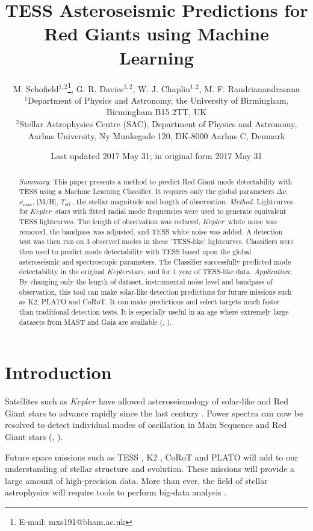 \documentclass[a4paper,fleqn,usenatbib,useAMS]{mnras}
\title[TRG]{TESS Asteroseismic Predictions for Red Giants using Machine Learning}
\author[M. Schofield et al.]{M. Schofield$^{1, 2}$\thanks{E-mail: mxs191@bham.ac.uk}, G. R. Davies$^{1, 2}$, W. J. Chaplin$^{1, 2}$, M. F. Randrianandrasana
\\
$^{1}$Department of Physics and Astronomy, the University of Birmingham, Birmingham B15 2TT, UK \\
$^{2}$Stellar Astrophysics Centre (SAC), Department of Physics and Astronomy, Aarhus University, Ny Munkegade 120, DK-8000 Aarhus C, Denmark}
\date{Last updated 2017 May 31; in original form 2017 May 31}
\newcommand{\numax}{\ensuremath{\nu_{\textrm{max}}}}
\newcommand{\dnu}{\ensuremath{\Delta\nu}}
\newcommand{\teff}{\ensuremath{T_{\textrm{eff}}\:}}
\newcommand{\kep}{\ensuremath{Kepler}\:}
\begin{document}
\label{firstpage}
\pagerange{\pageref{firstpage}--\pageref{lastpage}}
\maketitle

\begin{abstract}
{\it Summary}: This paper presents a method to predict Red Giant mode detectability with TESS using a Machine Learning Classifier. It requires only the global parameters \dnu, \numax, [M/H], \teff, the stellar magnitude and length of observation. \newline
{\it Method}: Lightcurves for \kep \ stars with fitted radial mode frequencies were used to generate equivalent TESS lightcurves. The length of observation was reduced, \kep \ white noise was removed, the bandpass was adjusted, and TESS white noise was added. A detection test was then run on 3 observed modes in these 'TESS-like' lightcurves. Classifiers were then used to predict mode detectability with TESS based upon the global asteroseismic and spectroscopic parameters. The Classifier successfully predicted mode detectability in the original \kep stars, and for 1 year of TESS-like data.\newline
{\it Application}: By changing only the length of dataset, instrumental noise level and bandpass of observation, this tool can make solar-like detection predictions for future missions such as K2, PLATO and CoRoT. It can make predictions and select targets much faster than traditional detection tests. It is especially useful in an age where extremely large datasets from MAST and Gaia are available (\citet{eisenstein_sdss-iii:_2011}, \citet{gaia_collaboration_gaia_2016}).
\end{abstract}


\section{Introduction}

Satellites such as $Kepler$ have allowed asteroseismology of solar-like and Red Giant stars to advance rapidly since the last century \citet{chaplin_asteroseismology_2013}. Power spectra can now be resolved to detect individual modes of oscillation in Main Sequence and Red Giant stars (\citet{lund_standing_2017}, \citet{davies_asteroseismology_2016}).

Future space missions such as TESS \citep{ricker_transiting_2014}, K2 \citep{howell_k2_2014}, CoRoT \citep{baglin_corot:_2006} and PLATO \citep{rauer_plato_2014} will add to our understanding of stellar structure and evolution. These missions will provide a large amount of high-precision data. More than ever, the field of stellar astrophysics will require tools to perform big-data analysis \citep{kremer_big_2017}. 
\end{document}

